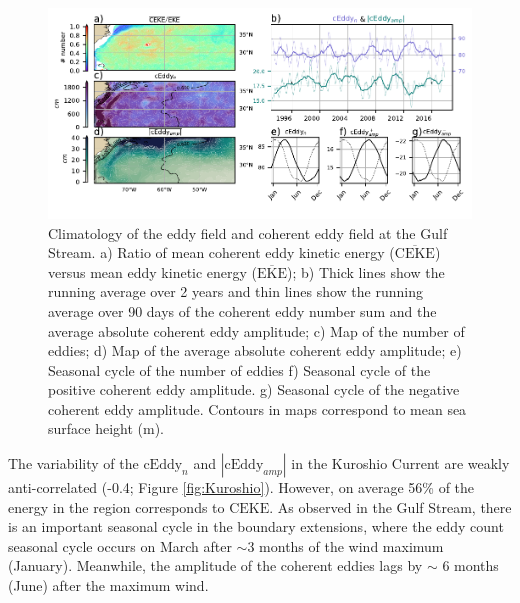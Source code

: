 \documentclass[draft,linenumbers]{agujournal2019}
\newcommand{\MEKE}{\overline{\textrm{EKE}}}
\newcommand{\MCEKE}{\overline{\textrm{CEKE}}}
\newcommand{\CEKE}{\textrm{CEKE}}
\newcommand{\cEddy}{\textrm{cEddy}}
\begin{document}
	\begin{figure}
	    \centering
	    \includegraphics[width=1\textwidth]{figures/regional_ratios_and_stats_V3_5.pdf}
	    \caption{Climatology of the eddy field and coherent eddy field at the Gulf Stream. a) Ratio of mean coherent eddy kinetic energy ($\MCEKE$) versus mean eddy kinetic energy ($\MEKE$); b) Thick lines show the running average over 2 years and thin lines show the running average over 90 days of the coherent eddy number sum and the average absolute coherent eddy amplitude; c) Map of the number of eddies; d) Map of the average absolute coherent eddy amplitude; e) Seasonal cycle of the number of eddies f) Seasonal cycle of the positive coherent eddy amplitude. g) Seasonal cycle of the negative coherent eddy amplitude. Contours in maps correspond to mean sea surface height (m).}
	    \label{fig:Gulf_Stream}
	\end{figure}

	The variability of the $\cEddy_{n}$ and $|\cEddy_{amp}|$ in the Kuroshio Current are weakly anti-correlated (-0.4; Figure \ref{fig:Kuroshio}). 
	However, on average 56\% of the energy in the region corresponds to $\CEKE$.
	As observed in the Gulf Stream, there is an important seasonal cycle in the boundary extensions, where the eddy count seasonal cycle occurs on March after $\sim$3 months of the wind maximum (January). Meanwhile, the amplitude of the coherent eddies lags by $\sim$ 6 months (June) after the maximum wind. 
\end{document}
